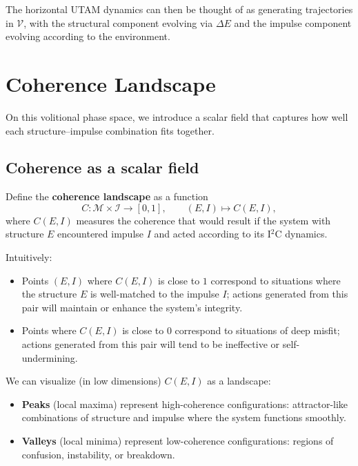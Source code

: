 \documentclass[12pt,a4paper]{report}
\begin{document}
The horizontal UTAM dynamics can then be thought of as generating trajectories in \(\mathcal{V}\), with the structural component evolving via $\Delta E$ and the impulse component evolving according to the environment.

\section{Coherence Landscape}

On this volitional phase space, we introduce a scalar field that captures how well each structure--impulse combination fits together.

\subsection*{Coherence as a scalar field}

Define the \textbf{coherence landscape} as a function
\[
    C : \mathcal{M} \times \mathcal{I} \to [0,1], \qquad
    (E, I) \mapsto C(E, I),
\]
where \(C(E, I)\) measures the coherence that would result if the system with structure \(E\) encountered impulse \(I\) and acted according to its I$^2$C dynamics.

Intuitively:

\begin{itemize}[leftmargin=2em]
    \item Points \((E, I)\) where \(C(E, I)\) is close to \(1\) correspond to situations where the structure \(E\) is well-matched to the impulse \(I\); actions generated from this pair will maintain or enhance the system's integrity.
    \item Points where \(C(E, I)\) is close to \(0\) correspond to situations of deep misfit; actions generated from this pair will tend to be ineffective or self-undermining.
\end{itemize}

We can visualize (in low dimensions) \(C(E, I)\) as a landscape:

\begin{itemize}[leftmargin=2em]
    \item \textbf{Peaks} (local maxima) represent high-coherence configurations: attractor-like combinations of structure and impulse where the system functions smoothly.
    \item \textbf{Valleys} (local minima) represent low-coherence configurations: regions of confusion, instability, or breakdown.
\end{itemize}
\end{document}

